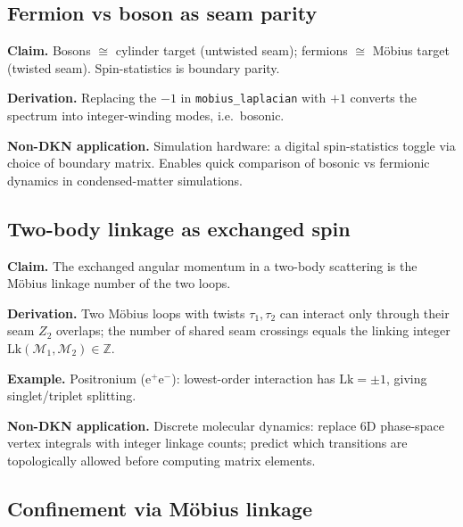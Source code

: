 \documentclass[11pt,a4paper]{article}
\theoremstyle{definition}
\begin{document}
\subsection{Fermion vs boson as seam parity}\label{nov:23}

\begin{tcolorbox}[noveltybox]
\textbf{Claim.} Bosons $\cong$ cylinder target (untwisted seam);
fermions $\cong$ M\"obius target (twisted seam). Spin-statistics is
boundary parity.
\end{tcolorbox}

\textbf{Derivation.} Replacing the $-1$ in \texttt{mobius\_laplacian}
with $+1$ converts the spectrum into integer-winding modes, i.e.\
bosonic.

\begin{tcolorbox}[applbox]
\textbf{Non-DKN application.}
Simulation hardware: a digital spin-statistics toggle via choice of
boundary matrix. Enables quick comparison of bosonic vs fermionic
dynamics in condensed-matter simulations.
\end{tcolorbox}

\subsection{Two-body linkage as exchanged spin}\label{nov:29}

\begin{tcolorbox}[noveltybox]
\textbf{Claim.} The exchanged angular momentum in a two-body
scattering is the M\"obius linkage number of the two loops.
\end{tcolorbox}

\textbf{Derivation.} Two M\"obius loops with twists $\tau_1, \tau_2$
can interact only through their seam $Z_2$ overlaps; the number of
shared seam crossings equals the linking integer
$\mathrm{Lk}(\mathcal{M}_1, \mathcal{M}_2) \in \mathbb{Z}$.

\textbf{Example.} Positronium (e$^+$e$^-$): lowest-order interaction
has $\mathrm{Lk} = \pm 1$, giving singlet/triplet splitting.

\begin{tcolorbox}[applbox]
\textbf{Non-DKN application.}
Discrete molecular dynamics: replace 6D phase-space vertex integrals
with integer linkage counts; predict which transitions are
topologically allowed before computing matrix elements.
\end{tcolorbox}

\subsection{Confinement via M\"obius linkage}\label{nov:30}
\end{document}

